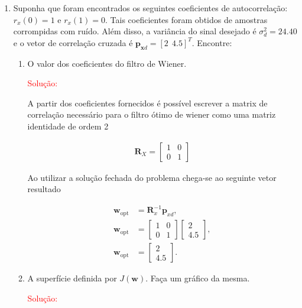\documentclass[a4paper,10pt]{article}
\begin{document}
\begin{enumerate}
			\item Suponha que foram encontrados os seguintes coeficientes de autocorrelação: $r_x(0) = 1$ e $r_x(1) = 0$. Tais coeficientes foram obtidos de amostras corrompidas com ruído. Além disso, a variância do sinal desejado é $\sigma_d^2 =
			24.40$ e o vetor de correlação cruzada é $\mathbf{p}_{\mathbf{x}d} = [2 \ \ 4.5]^T$. Encontre:
			
				\begin{enumerate}
					
					\item O valor dos coeficientes do filtro de Wiener.
					
						\textcolor{red}{Solução:}
						
						A partir dos coeficientes fornecidos é possível escrever a matrix de correlação necessário para o filtro ótimo de wiener como uma matriz identidade de ordem 2
						
						\begin{align}
							\mathbf{R}_{X} = \left[ \begin{matrix} 1 & 0 \\ 0 & 1 \end{matrix} \right]
						\end{align}
						
						Ao utilizar a solução fechada do problema chega-se ao seguinte vetor resultado
						
						\begin{align}
							\mathbf{w}_{\text{opt}} &= \mathbf{R}^{-1}_{x} \mathbf{p}_{xd}, \\
							\mathbf{w}_{\text{opt}} &=  \left[ \begin{matrix} 1 & 0 \\ 0 & 1 \end{matrix} \right]  \left[ \begin{matrix} 2 \\ 4.5 \end{matrix} \right], \\
							\mathbf{w}_{\text{opt}} &= \left[ \begin{matrix} 2 \\ 4.5 \end{matrix} \right].
						\end{align}
					
					\item A superfície definida por $J(\mathbf{w})$. Faça um gráfico da mesma.
					
						\textcolor{red}{Solução:}
						

\end{enumerate}
\end{enumerate}
\end{document}
